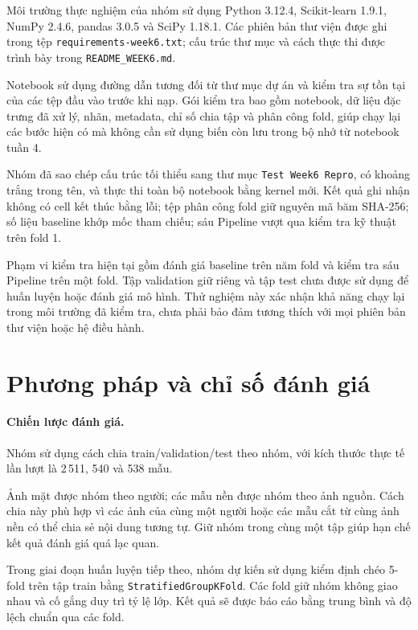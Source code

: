 \documentclass[12pt,a4paper,oneside]{report}
\begin{document}
Môi trường thực nghiệm của nhóm sử dụng Python 3.12.4,
Scikit-learn 1.9.1, NumPy 2.4.6, pandas 3.0.5
và SciPy 1.18.1. Các phiên bản thư viện được ghi trong
tệp \texttt{requirements-week6.txt};
cấu trúc thư mục và cách thực thi được trình bày
trong \texttt{README\_WEEK6.md}.

Notebook sử dụng đường dẫn tương đối từ thư mục dự án
và kiểm tra sự tồn tại của các tệp đầu vào trước khi nạp.
Gói kiểm tra bao gồm notebook, dữ liệu đặc trưng đã xử lý,
nhãn, metadata, chỉ số chia tập và phân công fold,
giúp chạy lại các bước hiện có mà không cần sử dụng
biến còn lưu trong bộ nhớ từ notebook tuần 4.

Nhóm đã sao chép cấu trúc tối thiểu sang thư mục
\texttt{Test Week6 Repro}, có khoảng trắng trong tên,
và thực thi toàn bộ notebook bằng kernel mới.
Kết quả ghi nhận không có cell kết thúc bằng lỗi;
tệp phân công fold giữ nguyên mã băm SHA-256;
số liệu baseline khớp mốc tham chiếu;
sáu Pipeline vượt qua kiểm tra kỹ thuật trên fold 1.

Phạm vi kiểm tra hiện tại gồm đánh giá baseline trên
năm fold và kiểm tra sáu Pipeline trên một fold.
Tập validation giữ riêng và tập test chưa được sử dụng
để huấn luyện hoặc đánh giá mô hình.
Thử nghiệm này xác nhận khả năng chạy lại trong
môi trường đã kiểm tra, chưa phải bảo đảm tương thích
với mọi phiên bản thư viện hoặc hệ điều hành.
\section{Phương pháp và chỉ số đánh giá}

\paragraph{Chiến lược đánh giá.}

Nhóm sử dụng cách chia train/validation/test theo nhóm,
với kích thước thực tế lần lượt là
2\,511, 540 và 538 mẫu.

Ảnh mặt được nhóm theo người;
các mẫu nền được nhóm theo ảnh nguồn.
Cách chia này phù hợp vì các ảnh của cùng một người
hoặc các mẫu cắt từ cùng ảnh nền có thể chia sẻ
nội dung tương tự.
Giữ nhóm trong cùng một tập giúp hạn chế
kết quả đánh giá quá lạc quan.

Trong giai đoạn huấn luyện tiếp theo, nhóm dự kiến
sử dụng kiểm định chéo 5-fold trên tập train bằng
\texttt{StratifiedGroupKFold}.
Các fold giữ nhóm không giao nhau và cố gắng
duy trì tỷ lệ lớp.
Kết quả sẽ được báo cáo bằng trung bình
và độ lệch chuẩn qua các fold.
\end{document}
